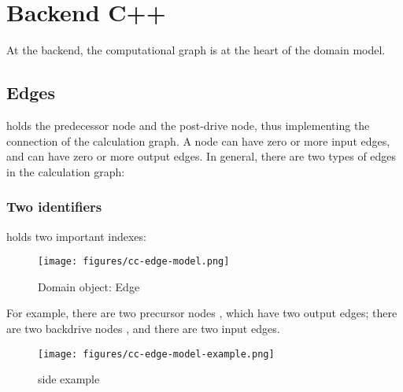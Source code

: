 \section{Backend C++}
\begin{content}
At the  backend, the computational graph is at the heart of the  domain model.


\subsection{Edges}
 holds the predecessor node and the post-drive node, thus implementing the connection of the calculation graph. A node can have zero or more input edges, and can have zero or more output edges. In general, there are two types of edges in the calculation graph:

\begin{enum}
\end{enum}


\subsubsection{Two identifiers}
 holds two important indexes:
\begin{enum}
\end{enum}


\begin{figure}[H]
  \centering
  \texttt{[image: figures/cc-edge-model.png]}
  \caption{Domain object: Edge}
  \label{fig:cc-edge-model}
\end{figure}

For example, there are two precursor nodes , which have two output edges; there are two backdrive nodes , and there are two input edges.

\begin{figure}[H]
\centering
\texttt{[image: figures/cc-edge-model-example.png]}
\caption{side example}
 \label{fig:cc-edge-model-example}
\end{figure}



\end{content}
